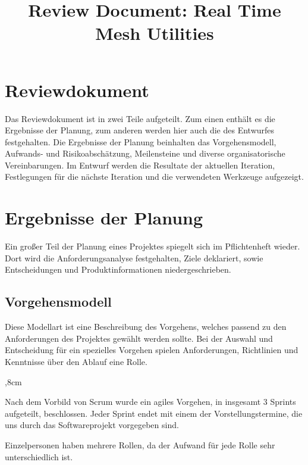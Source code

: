 \documentclass[a4paper, 11pt, ngerman, fleqn]{article}
\begin{document}
\title{Review Document: Real Time Mesh Utilities}
\vspace{3 in}
\maketitle
\clearpage

\section*{Reviewdokument}
Das Reviewdokument ist in zwei Teile aufgeteilt. 
Zum einen enthält es die Ergebnisse der Planung, zum anderen werden hier auch die des Entwurfes festgehalten.
Die Ergebnisse der Planung beinhalten das Vorgehensmodell, Aufwands- und Risikoabschätzung, Meilensteine und diverse organisatorische Vereinbarungen. Im Entwurf werden die Resultate der aktuellen Iteration, Festlegungen für die nächste Iteration und die verwendeten Werkzeuge aufgezeigt.

\section{Ergebnisse der Planung}

Ein großer Teil der Planung eines Projektes spiegelt sich im Pflichtenheft wieder. Dort wird die Anforderungsanalyse festgehalten, Ziele deklariert, sowie Entscheidungen und Produktinformationen niedergeschrieben.

\subsection{Vorgehensmodell}

Diese Modellart ist eine Beschreibung des Vorgehens, welches passend zu den Anforderungen des Projektes gewählt werden sollte. 
Bei der Auswahl und Entscheidung für ein spezielles Vorgehen spielen Anforderungen, Richtlinien und Kenntnisse über den Ablauf eine Rolle.

	\begin{description}
	,8cm
		\item[Gewähltes Vorgehen:] Nach dem Vorbild von Scrum wurde ein agiles Vorgehen, in insgesamt 3 Sprints aufgeteilt, beschlossen. 
		Jeder Sprint endet mit einem der Vorstellungstermine, die uns durch das Softwareprojekt vorgegeben sind. 
		
		\item[Projektspezifische Anpassungen:] Einzelpersonen haben mehrere Rollen, da der Aufwand für jede Rolle sehr unterschiedlich ist.
	\end{description} 
	
\end{document}
